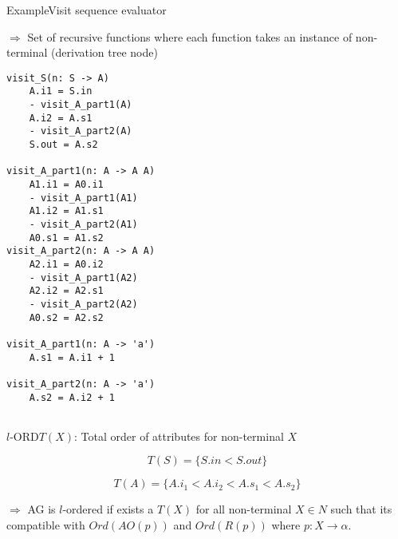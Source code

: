 \begin{frame}[fragile=singleslide]{Example}{Visit sequence evaluator}

$\Rightarrow$ Set of \alert{recursive functions} where each function takes an \alert{instance of non-terminal} (derivation tree node)

\begin{multicols}{2}
\begin{Verbatim}[fontsize=\scriptsize]
visit_S(n: S -> A)
    A.i1 = S.in
    - visit_A_part1(A)
    A.i2 = A.s1
    - visit_A_part2(A)
    S.out = A.s2

visit_A_part1(n: A -> A A)
    A1.i1 = A0.i1
    - visit_A_part1(A1)
    A1.i2 = A1.s1
    - visit_A_part2(A1)
    A0.s1 = A1.s2
visit_A_part2(n: A -> A A)
    A2.i1 = A0.i2
    - visit_A_part1(A2)
    A2.i2 = A2.s1
    - visit_A_part2(A2)
    A0.s2 = A2.s2

visit_A_part1(n: A -> 'a')
    A.s1 = A.i1 + 1

visit_A_part2(n: A -> 'a')
    A.s2 = A.i2 + 1
    
\end{Verbatim}
\end{multicols}
\end{frame}



\begin{frame}{$l$-ORD}{$T(X)$: Total order of attributes for non-terminal $X$ }

\[  T(S) = \{ S.\mathit{in} < S.\mathit{out}  \}  \]

\[  T(A) = \{ A.i_1 < A.i_2 < A.s_1 < A.s_2 \}  \]

\newlinevspace

$\Rightarrow$ AG is $l$-ordered if exists a $T(X)$  for all non-terminal $X \in N$ such that its \alert{compatible} with $\mathit{Ord}(\mathit{AO}(p))$ and $\mathit{Ord}(R(p))$ where $p: X \rightarrow \alpha$. 

\end{frame}




